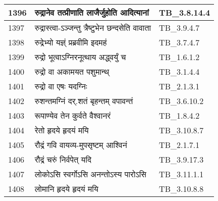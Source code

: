 \documentclass[17pt]{extarticle}
\begin{document}
\begin{longtable}{||p{0.4in}||p{4.9in}||p{0.9in}||}
    1396 & रुद्रानेव तत्प्रीणाति लाजैर्जुहोति आदित्यानां & TB\_3.8.14.4       \\
    
    \hline
        
    1397 & रुद्रास्त्वा{-}ऽञ्जन्तु त्रैष्टुभेन छन्दसेति वावाता & TB\_3.9.4.7       \\
    
    \hline
        
    1398 & रुद्रेभ्यो यज्ञ्ं प्रब्रवीमि इदमहं & TB\_3.7.4.7       \\
    
    \hline
        
    1399 & रुद्रो भूत्वाऽग्निरनूत्थाय अद्ध्वर्युं च & TB\_1.6.1.2       \\
    
    \hline
        
    1400 & रुद्रो वा अकामयत पशुमान्थ् & TB\_3.1.4.4       \\
    
    \hline
        
    1401 & रुद्रो वा एषः यदग्निः & TB\_2.1.3.1       \\
    
    \hline
        
    1402 & रुशन्तमग्निं दर्.शतं बृहन्तम् वपावन्तं & TB\_3.6.10.2       \\
    
    \hline
        
    1403 & रूपाण्येव तेन कुर्वते वैश्वानरं & TB\_1.8.4.2       \\
    
    \hline
        
    1404 & रेतो हृदये हृदयं मयि & TB\_3.10.8.7       \\
    
    \hline
        
    1405 & रौद्रं गवि वायव्य{-}मुपसृष्टम् आश्विनं & TB\_2.1.7.1       \\
    
    \hline
        
    1406 & रौद्रं चरुं निर्वपेत् यदि & TB\_3.9.17.3       \\
    
    \hline
        
    1407 & लोकोऽसि स्वर्गोऽसि अनन्तोऽस्य पारोऽसि & TB\_3.11.1.1       \\
    
    \hline
        
    1408 & लोमानि हृदये हृदयं मयि & TB\_3.10.8.8       \\
    

\end{longtable}
\end{document}
